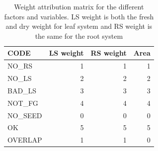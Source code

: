 \begin{table}[htbp]
  \centering
  \caption{Weight attribution matrix for the different factors and variables. LS weight is both the fresh and dry weight for leaf system and RS weight is the same for the root system}
    \begin{tabular}{lrrr}
    \toprule
    CODE  & \multicolumn{1}{l}{LS weight} & \multicolumn{1}{l}{RS weight} & \multicolumn{1}{l}{Area} \\
    \midrule
    NO\_RS & 1     & 1     & 1 \\
    NO\_LS & 2     & 2     & 2 \\
    BAD\_LS & 3     & 3     & 3 \\
    NOT\_FG & 4     & 4     & 4 \\
    \textcolor[rgb]{ 1,  0,  0}{NO\_SEED} & \textcolor[rgb]{ 1,  0,  0}{0} & \textcolor[rgb]{ 1,  0,  0}{0} & \textcolor[rgb]{ 1,  0,  0}{0} \\
    \textcolor[rgb]{ 0,  .69,  .314}{OK} & \textcolor[rgb]{ 0,  .69,  .314}{5} & \textcolor[rgb]{ 0,  .69,  .314}{5} & \textcolor[rgb]{ 0,  .69,  .314}{5} \\
    OVERLAP & 1     & 1     & 0 \\
    \bottomrule
    \end{tabular}%
  \label{tab:weight_attribution_matrix}%
\end{table}%


